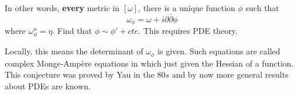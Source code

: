 


In other words, \textbf{every} metric in $[\omega]$, there is a unique function $\phi$ such that
\begin{equation}
    \omega_\phi = \omega + i \partial \overline{\partial} \phi
\end{equation}
where $\omega_\phi^n = \eta$. Find that $\phi \sim \phi' + cte$. This requires PDE theory.

Locally, this means the determinant of $\omega_\phi$ is given. Such equations are called complex Monge-Ampère equations in which just given the Hessian of a function.
This conjecture was proved by Yau in the $80s$ and by now more general results about PDEs are known.


